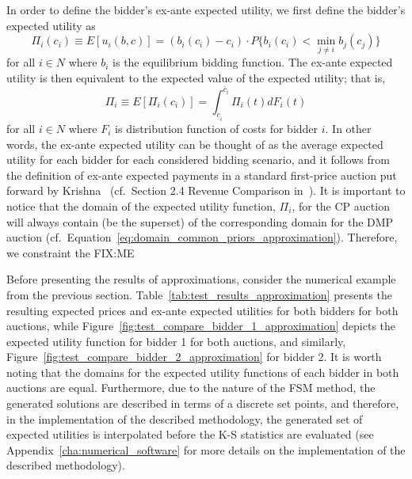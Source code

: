 In order to define the bidder's ex-ante expected utility, we first define the bidder's expected utility as
\begin{equation}
  \label{eq:expected_utility_approximation}
  \Pi_i(c_i) \equiv E[u_i(b,c)] = (b_i(c_i) - c_i)\cdot P\{b_i(c_i) < \min_{j\neq i} b_j(c_j)\}
\end{equation}
for all $i\in N$ where $b_i$ is the equilibrium bidding function. The ex-ante expected utility is then equivalent to the expected value of the expected utility; that is,
\begin{equation}
  \label{eq:ex_ante_expected_utility_approximation}
  \Pi_i \equiv E[\Pi_i(c_i)] = \int_{\underline{c}_i}^{\bar{c}_i} \Pi_i(t)dF_i(t)
\end{equation}
for all $i\in N$ where $F_i$ is distribution function of costs for bidder $i$. In other words, the ex-ante expected utility can be thought of as the average expected utility for each bidder for each considered bidding scenario, and it follows from the definition of ex-ante expected payments in a standard first-price auction put forward by Krishna~\cite{Krishna10} (cf.~Section 2.4 Revenue Comparison in~\cite{Krishna10}). It is important to notice that the domain of the expected utility function, $\Pi_i$, for the CP auction will always contain (be the superset) of the corresponding domain for the DMP auction (cf.~Equation~\eqref{eq:domain_common_priors_approximation}). Therefore, we constraint the FIX:ME

Before presenting the results of approximations, consider the numerical example from the previous section. Table~\ref{tab:test_results_approximation} presents the resulting expected prices and ex-ante expected utilities for both bidders for both auctions, while Figure~\ref{fig:test_compare_bidder_1_approximation} depicts the expected utility function for bidder 1 for both auctions, and similarly, Figure~\ref{fig:test_compare_bidder_2_approximation} for bidder 2. It is worth noting that the domains for the expected utility functions of each bidder in both auctions are equal. Furthermore, due to the nature of the FSM method, the generated solutions are described in terms of a discrete set points, and therefore, in the implementation of the described methodology, the generated set of expected utilities is interpolated before the K-S statistics are evaluated (see Appendix~\ref{cha:numerical_software} for more details on the implementation of the described methodology).

